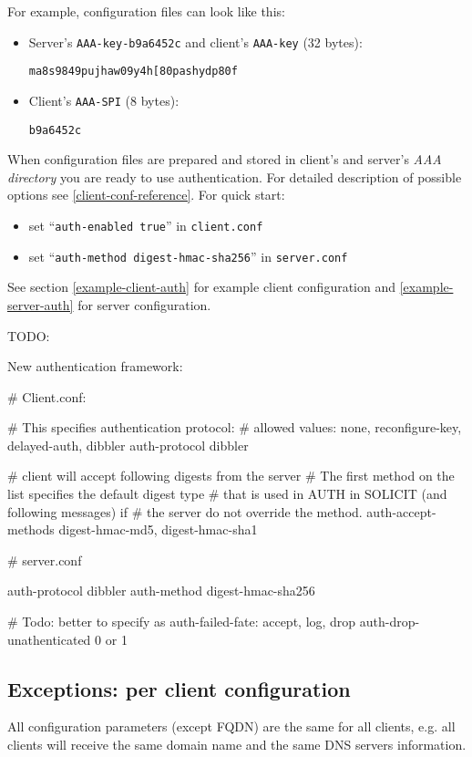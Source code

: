For example, configuration files can look like this:

\begin{itemize}
\item Server's \texttt{AAA-key-b9a6452c} and client's \texttt{AAA-key}
  (32 bytes):
\begin{lstlisting}
ma8s9849pujhaw09y4h[80pashydp80f
\end{lstlisting}

\item Client's \texttt{AAA-SPI} (8 bytes):
\begin{lstlisting}
b9a6452c
\end{lstlisting}
\end{itemize}

When configuration files are prepared and stored in client's and
server's \textit{AAA directory} you are ready to use
authentication. For detailed description of possible options see
\ref{client-conf-reference}. For quick start:
\begin{itemize}
 \item set ``\texttt{auth-enabled true}'' in \texttt{client.conf}

 \item set ``\texttt{auth-method digest-hmac-sha256}'' in
   \texttt{server.conf}

\end{itemize}

See section \ref{example-client-auth} for example client configuration
and \ref{example-server-auth} for server configuration.

TODO:

New authentication framework:

# Client.conf:

# This specifies authentication protocol:
# allowed values: none, reconfigure-key, delayed-auth, dibbler
auth-protocol dibbler

# client will accept following digests from the server
# The first method on the list specifies the default digest type
# that is used in AUTH in SOLICIT (and following messages) if
# the server do not override the method.
auth-accept-methods digest-hmac-md5, digest-hmac-sha1


# server.conf

auth-protocol dibbler
auth-method digest-hmac-sha256

# Todo: better to specify as auth-failed-fate: accept, log, drop
auth-drop-unathenticated 0 or 1

\subsection{Exceptions: per client configuration}
\label{feature-exceptions}
All configuration parameters (except FQDN) are the same for all
clients, e.g. all clients will receive the same domain name and the
same DNS servers information.

